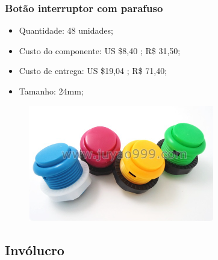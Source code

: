 \documentclass[hyperref={pdfpagelabels=false}]{beamer}
\begin{document}
            \begin{frame}\frametitle{Botão interruptor com parafuso}

      	          \begin{itemize}
       	             \item Quantidade: 48 unidades;
        	         \item Custo do componente: US \$8,40 ; R\$ 31,50;
    	             \item Custo de entrega: US \$19,04 ; R\$ 71,40;
    	             \item Tamanho: 24mm;
         	      \end{itemize}

        	      \begin{figure}
                        \includegraphics[scale=0.5]{Imagens/Apresentacao_2/botoes.png}
            	  \end{figure}	

           	\end{frame}

        \subsection{Invólucro}
\end{document}
